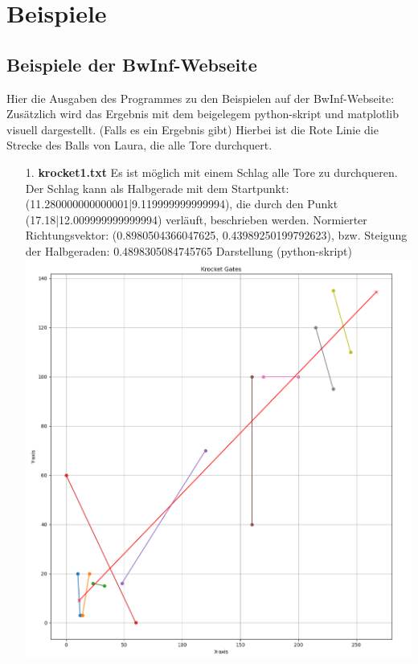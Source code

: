 \documentclass[a4paper,10pt,ngerman]{scrartcl}
\begin{document}
\section{Beispiele}
\subsection{Beispiele der BwInf-Webseite}
Hier die Ausgaben des Programmes zu den Beispielen auf der BwInf-Webseite: Zusätzlich wird das Ergebnis mit dem beigelegem python-skript und matplotlib visuell dargestellt. (Falls es ein Ergebnis gibt) Hierbei ist die
Rote Linie die Strecke des Balls von Laura, die alle Tore durchquert.
\begin{itemize}
  \item [1.] \textbf{krocket1.txt}
    \newline
    Es ist möglich mit einem Schlag alle Tore zu durchqueren.
    \newline
    Der Schlag kann als Halbgerade mit dem Startpunkt: (11.280000000000001|9.119999999999994), die durch den Punkt (17.18|12.009999999999994) verläuft, beschrieben werden.
    \newline
    Normierter Richtungsvektor: (0.8980504366047625, 0.43989250199792623), bzw. Steigung der Halbgeraden: 0.4898305084745765
    \newline
    \newline
    Darstellung (python-skript)
    \newline
    \includegraphics[scale=0.27]{krocket1.png}


\end{itemize}
\end{document}
